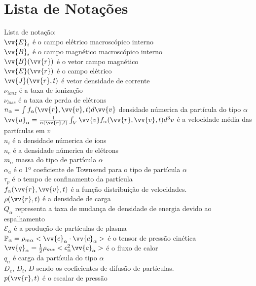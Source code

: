 \documentclass[12pt,oneside,a4paper]{abntex2}
\begin{document}
\chapter{Lista de Notações}
\label{Listanot}
Lista de notação:\\
$\vv{E}_i$ é o campo elétrico macroscópico interno\\
$\vv{B}_i$ é o campo magnético macroscópico interno\\
$\vv{B}(\vv{r})$ é o vetor campo magnético\\
$\vv{E}(\vv{r})$ é o campo elétrico\\
$\vv{J}(\vv{r},t)$ é vetor densidade de corrente\\
$\nu_{ionz}$ é a taxa de ionização\\
$\nu_{loss}$ é a taxa de perda de elétrons\\
$n_{\alpha} = \int{f_\alpha(\vv{r},\vv{v},t)}d\vv{v}$ densidade númerica da partícula do tipo $\alpha$\\
$\vv{u}_{\alpha} = \frac{1}{n(\vv{r},t)} \int_V{\vv{v} f_{\alpha}(\vv{r},\vv{v},t) d^3v}$ é a velocidade média das partículas em $v$\\
$n_i$ é a densidade númerica de íons\\
$n_e$ é a densidade númerica de elétrons\\
$m_\alpha$ massa do tipo de partícula $\alpha$\\
$\alpha_a$ é o 1º coeficiente de Townsend para o tipo de partícula $\alpha$ \\
$\tau_p$ é o tempo de confinamento da partícula\\
$f_\alpha(\vv{r},\vv{v},t)$ é a função distribuição de velocidades.\\
$\rho(\vv{r},t)$ é a densidade de carga\\
$Q_\alpha$ representa a taxa de mudança de densidade de energia devido ao espalhamento\\
$\mathcal{E}_\alpha$ é a produção de partículas de plasma\\
 $\mathbb{P}_\alpha = \rho_{m\alpha}<\vv{c}_\alpha \cdot \vv{c}_\alpha>$ é o tensor de pressão cinética\\ 
$\vv{q}_\alpha = \frac{1}{2} \rho_{m\alpha} <c^2_\alpha  \vv{c}_\alpha>$ é o fluxo de calor \\
$q_\alpha$ é carga da partícula do tipo $\alpha$ \\
$D_e$, $D_i$, $D$ sendo os coeficientes de difusão de partículas. \\
$p(\vv{r},t)$ é o escalar de pressão\\
\end{document}
